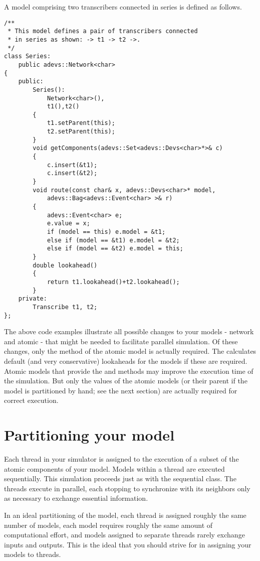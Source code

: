 A model comprising two transcribers connected in series is defined as follows. 
\begin{verbatim}
/**
 * This model defines a pair of transcribers connected
 * in series as shown: -> t1 -> t2 ->.
 */
class Series:
    public adevs::Network<char>
{
    public:
        Series():
            Network<char>(),
            t1(),t2()
        {
            t1.setParent(this);
            t2.setParent(this);
        }
        void getComponents(adevs::Set<adevs::Devs<char>*>& c)
        {
            c.insert(&t1);
            c.insert(&t2);
        }
        void route(const char& x, adevs::Devs<char>* model,
            adevs::Bag<adevs::Event<char> >& r)
        {
            adevs::Event<char> e;
            e.value = x;
            if (model == this) e.model = &t1;
            else if (model == &t1) e.model = &t2;
            else if (model == &t2) e.model = this;
        }
        double lookahead()
        {
            return t1.lookahead()+t2.lookahead();
        }
    private:
        Transcribe t1, t2;
};
\end{verbatim}

The above code examples illustrate all possible changes to your models - network and atomic - that might be needed to facilitate parallel simulation. Of these changes, only the  method of the atomic model is actually required. The  calculates default (and very conservative) lookaheads for the  models if these are required. Atomic models that provide the  and  methods may improve the execution time of the simulation. But only the  values of the atomic models (or their parent if the model is partitioned by hand; see the next section) are actually required for correct execution.

\section{Partitioning your model}
Each thread in your simulator is assigned to the execution of a subset of the atomic components of your model. Models within a thread are executed sequentially. This simulation proceeds just as with the sequential  class. The threads execute in parallel, each stopping to synchronize with its neighbors only as necessary to exchange essential information.

In an ideal partitioning of the model, each thread is assigned roughly the same number of models, each model requires roughly the same amount of computational effort, and models assigned to separate threads rarely exchange inputs and outputs. This is the ideal that you should strive for in assigning your models to threads.

